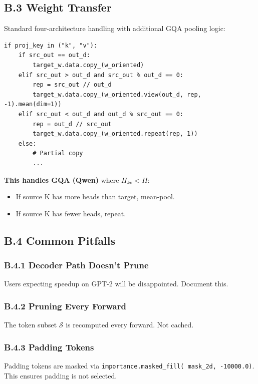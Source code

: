 \subsection{B.3 Weight Transfer}

Standard four-architecture handling with additional GQA pooling logic:

\begin{lstlisting}
if proj_key in ("k", "v"):
    if src_out == out_d:
        target_w.data.copy_(w_oriented)
    elif src_out > out_d and src_out % out_d == 0:
        rep = src_out // out_d
        target_w.data.copy_(w_oriented.view(out_d, rep, -1).mean(dim=1))
    elif src_out < out_d and out_d % src_out == 0:
        rep = out_d // src_out
        target_w.data.copy_(w_oriented.repeat(rep, 1))
    else:
        # Partial copy
        ...
\end{lstlisting}

\textbf{This handles GQA (Qwen)} where $H_{kv} < H$:
\begin{itemize}
\item If source K has more heads than target, mean-pool.
\item If source K has fewer heads, repeat.

\end{itemize}
\subsection{B.4 Common Pitfalls}

\subsubsection{B.4.1 Decoder Path Doesn't Prune}

Users expecting speedup on GPT-2 will be disappointed. Document this.

\subsubsection{B.4.2 Pruning Every Forward}

The token subset $\mathcal{S}$ is recomputed every forward. Not cached.

\subsubsection{B.4.3 Padding Tokens}

Padding tokens are masked via \texttt{importance.masked\_fill(~mask\_2d, -10000.0)}. 
This ensures padding is not selected.

